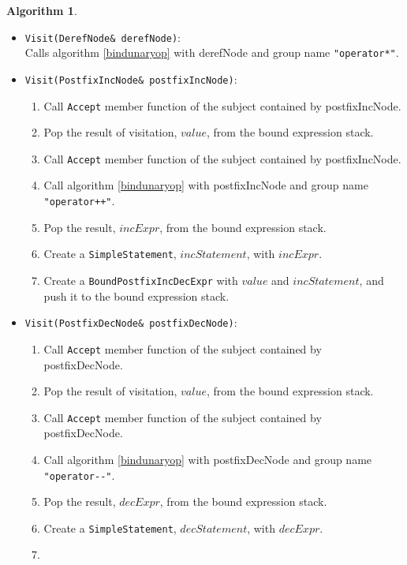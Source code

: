 \documentclass[a4paper,oneside,11pt]{book}
\theoremstyle{definition}
\newtheorem{algo}{Algorithm}[section]
\begin{document}
\begin{algo}
\begin{itemize}
\verb|Visit(AddrOfNode& addrOfNode)|:\\
Calls algorithm \ref{bindunaryop} with addrOfNode and group name \verb|"operator&"|.\\
\item
\verb|Visit(DerefNode& derefNode)|:\\
Calls algorithm \ref{bindunaryop} with derefNode and group name \verb|"operator*"|.\\
\item
\verb|Visit(PostfixIncNode& postfixIncNode)|:\\
\begin{enumerate}
\item
Call \verb|Accept| member function of the subject contained by postfixIncNode.
\item
Pop the result of visitation, $value$, from the bound expression stack.
\item
Call \verb|Accept| member function of the subject contained by postfixIncNode.
\item
Call algorithm \ref{bindunaryop} with postfixIncNode and group name \verb|"operator++"|.\\
\item
Pop the result, $incExpr$, from the bound expression stack.
\item
Create a \verb|SimpleStatement|, $incStatement$, with $incExpr$.
\item
Create a \verb|BoundPostfixIncDecExpr| with $value$ and $incStatement$, and push it to the bound expression stack.
\end{enumerate}
\item
\verb|Visit(PostfixDecNode& postfixDecNode)|:\\
\begin{enumerate}
\item
Call \verb|Accept| member function of the subject contained by postfixDecNode.
\item
Pop the result of visitation, $value$, from the bound expression stack.
\item
Call \verb|Accept| member function of the subject contained by postfixDecNode.
\item
Call algorithm \ref{bindunaryop} with postfixDecNode and group name \verb|"operator--"|.\\
\item
Pop the result, $decExpr$, from the bound expression stack.
\item
Create a \verb|SimpleStatement|, $decStatement$, with $decExpr$.
\item

\end{enumerate}
\end{itemize}
\end{algo}
\end{document}
